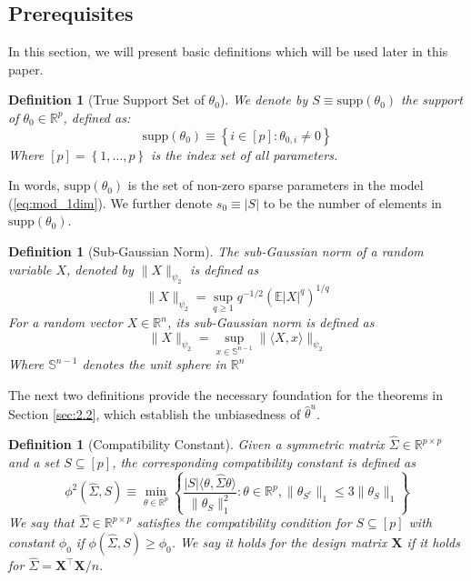 \documentclass{article}
\newtheorem{definition}[theorem]{Definition}
\begin{document}

\subsection{Prerequisites}
\label{sec:2.1}
In this section, we will present basic definitions which will be used later in this paper.
\begin{definition}[True Support Set of $\theta_0$]
We denote by $S \equiv \text{supp}(\theta_0)$ the support of $\theta_0 \in \mathbb{R}^p$, defined as: 
\begin{equation}
\label{eq:supp_theta}
    \text{supp}(\theta_0) \equiv \left\{i \in [p]: \theta_{0,i} \neq 0 \right\}
\end{equation}
Where $[p] = \left\{1, \dots, p \right\}$ is the index set of all parameters. 
\end{definition}
\noindent
In words, $\text{supp}(\theta_0)$ is the set of non-zero sparse parameters in the model (\ref{eq:mod_1dim}). We further denote $s_0 \equiv |S|$ to be the number of elements in $\text{supp}(\theta_0)$.

\begin{definition}[Sub-Gaussian Norm]
The sub-Gaussian norm of a random variable $X$, denoted by $\|X\|_{\psi_2}$ is defined as
$$
\|X\|_{\psi_2} = \sup_{q \ge 1} q^{-1/2} (\mathbb{E}|X|^q)^{1/q}
$$
For a random vector $X \in \mathbb{R}^n$, its sub-Gaussian norm is defined as
$$
\|X\|_{\psi_2} = \sup_{x \in \mathbb{S}^{n-1}}\|\langle X, x\rangle\|_{\psi_2}
$$
Where $\mathbb{S}^{n-1}$ denotes the unit sphere in $\mathbb{R}^n$
\end{definition}
\noindent
The next two definitions provide the necessary foundation for the theorems in Section \ref{sec:2.2}, which establish the unbiasedness of $\hat{\theta}^{u}$.

\begin{definition}[Compatibility Constant]
Given a symmetric matrix $\hat{\Sigma} \in \mathbb{R}^{p\times p}$ and a set $S \subseteq [p]$, the corresponding compatibility constant is defined as
\begin{equation}
    \phi^2(\hat{\Sigma}, S) \equiv \underset{\theta\in \mathbb{R}^p}{\min} \left\{\frac{|S| \langle \theta, \hat{\Sigma}\theta \rangle}{\|\theta_S\|^2_1}: \theta \in \mathbb{R}^p, \|\theta_{S^c}\|_1 \le 3 \|\theta_S \|_1\right\}
\end{equation}
We say that $\hat{\Sigma} \in \mathbb{R}^{p\times p}$ satisfies the compatibility condition for $S \subseteq [p]$ with constant $\phi_0$ if $\phi(\hat{\Sigma}, S) \ge \phi_0$. We say it holds for the design matrix $\mathbf{X}$ if it holds for $\hat{\Sigma} = \mathbf{X}^\top\mathbf{X}/n$.
\end{definition}
\end{document}
